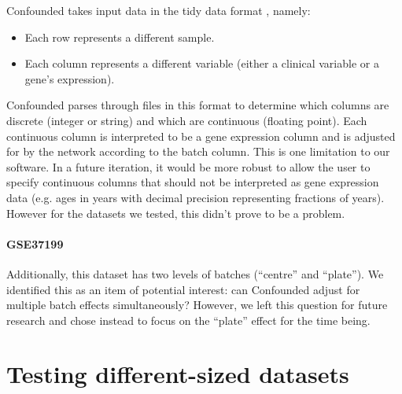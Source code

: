 \documentclass{article}
\begin{document}
Confounded takes input data in the tidy data format \cite{wickham_tidy_2014-1}, namely:

\begin{itemize}
	\item Each row represents a different sample.
	\item Each column represents a different variable (either a clinical variable or a gene's expression).
\end{itemize}

Confounded parses through files in this format to determine which columns are discrete (integer or string) and which are continuous (floating point).
Each continuous column is interpreted to be a gene expression column and is adjusted for by the network according to the batch column.
This is one limitation to our software.
In a future iteration, it would be more robust to allow the user to specify continuous columns that should not be interpreted as gene expression data (e.g. ages in years with decimal precision representing fractions of years).
However for the datasets we tested, this didn't prove to be a problem.

\paragraph{GSE37199}

Additionally, this dataset has two levels of batches (``centre'' and ``plate'').
We identified this as an item of potential interest: can Confounded adjust for multiple batch effects simultaneously?
However, we left this question for future research and chose instead to focus on the ``plate'' effect for the time being.

\section{Testing different-sized datasets}
\end{document}

